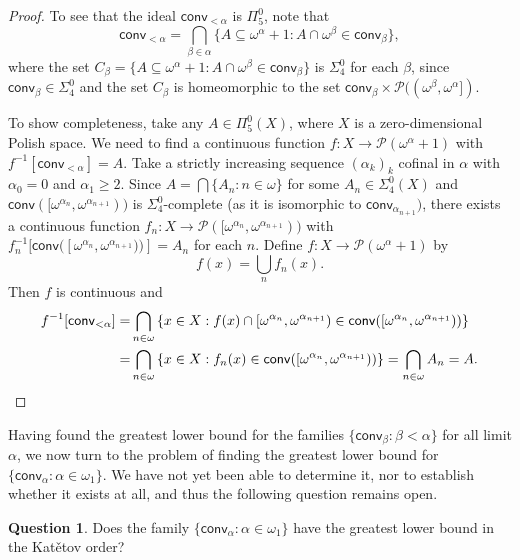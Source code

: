 \documentclass{amsart}
\theoremstyle{plain}
\theoremstyle{definition}
\newtheorem{question}[theorem]{Question}
\theoremstyle{remark}
\newcommand{\cP}{\mathcal{P}}
\newcommand{\conv}{\mathsf{conv}}
\renewcommand{\subset}{\subseteq}
\begin{document}
\begin{proof}
To see that the ideal $\conv_{<\alpha}$ is $\Pi^0_5$, note that $$\conv_{<\alpha}=\bigcap_{\beta\in\alpha}\{A\subset\omega^\alpha+1 : A\cap\omega^{\beta}\in\conv_{\beta}\},$$
where the set $C_\beta=\{A\subset\omega^\alpha+1 : A\cap\omega^{\beta}\in\conv_{\beta}\}$ is $\Sigma^0_4$ for each $\beta$, since $\conv_\beta\in\Sigma^0_4$ and the set $C_\beta$ is homeomorphic to the set $\conv_\beta \times \cP((\omega^\beta,  \omega^\alpha])$.

To show completeness, take any $A\in\Pi^0_5(X)$, where $X$ is a zero-dimensional Polish space. We need to find a continuous function $f: X\to \cP(\omega^\alpha+1)$ with $f^{-1}[\conv_{<\alpha}]=A$. Take a strictly increasing sequence $(\alpha_k)_k$ cofinal in $\alpha$ with $\alpha_0=0$ and $\alpha_1\geq 2$. Since $A=\bigcap \{A_n :n\in\omega\}$ for some $A_n\in\Sigma^0_4(X)$ and $\conv([\omega^{\alpha_n},\omega^{\alpha_{n+1}}))$ is $\Sigma^0_4$-complete (as it is isomorphic to $\conv_{\alpha_{n+1}})$,  there exists a continuous function $f_n:X\to \cP([\omega^{\alpha_n},\omega^{\alpha_{n+1}}))$ with $f_n^{-1}[\conv([\omega^{\alpha_n},\omega^{\alpha_{n+1}}))]=A_n $
for each $n$. Define $f:X\to \cP(\omega^\alpha+1)$ by $$f(x)=\bigcup_n f_n(x).$$ Then $f$ is continuous and 
\begin{equation*}
    \begin{split}   
f^{-1}[\conv_{<\alpha}]
=& 
\bigcap_{n\in\omega}\left\{x\in X : f(x)\cap[\omega^{\alpha_n},\omega^{\alpha_{n+1}})\in \conv([\omega^{\alpha_n},\omega^{\alpha_{n+1}}))\right\}
\\=&
\bigcap_{n\in\omega}\left\{x\in X : f_n(x)\in \conv([\omega^{\alpha_n},\omega^{\alpha_{n+1}}))\right\}
=\bigcap_{n\in\omega}A_n=A.
   \qedhere
   \end{split}
\end{equation*}
\end{proof}

Having found the greatest lower bound for the families $\{\conv_\beta : \beta<\alpha\}$ for all limit $\alpha$, we now turn to the problem of finding the greatest lower bound for $\{\conv_\alpha : \alpha\in\omega_1\}$. 
We have not yet been able to determine it, nor to establish whether it exists at all, and thus the following question remains open.
\begin{question}
Does the family
$\{\conv_\alpha : \alpha\in\omega_1\}$
have the greatest lower bound in the Kat\v{e}tov order?
\end{question}
\end{document}
